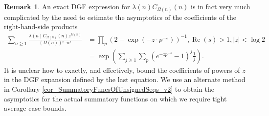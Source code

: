 \documentclass[11pt,reqno,a4letter]{article}
\numberwithin{figure}{section}
\numberwithin{table}{section}
\theoremstyle{plain}
\numberwithin{theorem}{section}
\theoremstyle{definition}
\newtheorem{remark}[theorem]{Remark}
\renewcommand{\Re}{\operatorname{Re}}
\begin{document}
\begin{remark}
An exact DGF expression for 
$\lambda(n) C_{\Omega(n)}(n)$ is in fact very much complicated by the need to estimate the asymptotics 
of the coefficients of the right-hand-side products 
\begin{align*} 
\sum_{n \geq 1} \frac{\lambda(n) C_{\Omega(n)}(n) z^{\Omega(n)}}{(\Omega(n))! \cdot n^s} & = 
     \prod_p \left(2 - \exp\left(-z \cdot p^{-s}\right)\right)^{-1}, 
     \Re(s) > 1, |z| < \log 2 \\ 
     & = \exp\left(\sum_{j \geq 1} \sum_p \left(e^{-zp^{-s}}-1\right)^{j} \frac{1}{j}\right). 
\end{align*} 
It is unclear how to exactly, and effectively, bound the 
coefficients of powers of $z$ in the DGF expansion defined by the last equation. 
We use an alternate method in 
Corollary \ref{cor_SummatoryFuncsOfUnsignedSeqs_v2} 
to obtain the asymptotics for the actual 
summatory functions on which we require tight average case bounds. 
\end{remark} 
\end{document}

